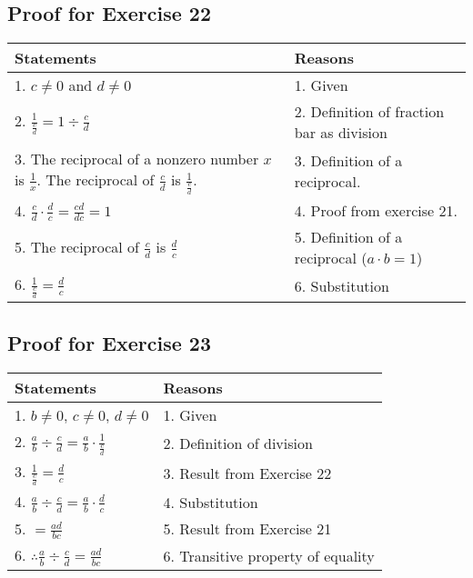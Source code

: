 \documentclass{article}
\begin{document}
\vspace{1cm}

\subsection*{Proof for Exercise 22}
\begin{tabular}{l p{7cm}}
    \textbf{Statements} & \textbf{Reasons} \\
    \hline
    1. $c \neq 0$ and $d \neq 0$ & 1. Given \\
    2. $\frac{1}{\frac{c}{d}} = 1 \div \frac{c}{d}$ & 2. Definition of fraction bar as division \\
    3. The reciprocal of a nonzero number $x$ is $\frac{1}{x}$. The reciprocal of $\frac{c}{d}$ is $\frac{1}{\frac{c}{d}}$. & 3. Definition of a reciprocal. \\
    4. $\frac{c}{d} \cdot \frac{d}{c} = \frac{cd}{dc} = 1$ & 4. Proof from exercise 21. \\
    5. The reciprocal of $\frac{c}{d}$ is $\frac{d}{c}$ & 5. Definition of a reciprocal ($a \cdot b = 1$) \\
    6. $\frac{1}{\frac{c}{d}} = \frac{d}{c}$ & 6. Substitution \\
\end{tabular}

\vspace{1cm}

\subsection*{Proof for Exercise 23}
\begin{tabular}{l p{7cm}}
    \textbf{Statements} & \textbf{Reasons} \\
    \hline
    1. $b \neq 0$, $c \neq 0$, $d \neq 0$ & 1. Given \\
    2. $\frac{a}{b} \div \frac{c}{d} = \frac{a}{b} \cdot \frac{1}{\frac{c}{d}}$ & 2. Definition of division \\
    3. $\frac{1}{\frac{c}{d}} = \frac{d}{c}$ & 3. Result from Exercise 22 \\
    4. $\frac{a}{b} \div \frac{c}{d} = \frac{a}{b} \cdot \frac{d}{c}$ & 4. Substitution \\
    5. $= \frac{ad}{bc}$ & 5. Result from Exercise 21 \\
    6. $\therefore \frac{a}{b} \div \frac{c}{d} = \frac{ad}{bc}$ & 6. Transitive property of equality \\
\end{tabular}
\end{document}

